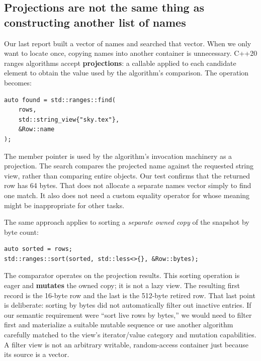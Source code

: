 \subsection{Projections are not the same thing as constructing another list of names}\label{01-foundations-i-ch006-projections-are-not-the-same-thing-as-constructing-another-list-of-names}

\hypertarget{01-foundations-i-ch006-projections-are-not-the-same-thing-as-constructing-another-list-of-names}{}

Our last report built a vector of names and searched that vector. When we only want to locate  once, copying names into another container is unnecessary. C++20 ranges algorithms accept \textbf{projections}: a callable applied to each candidate element to obtain the value used by the algorithm's comparison. The operation becomes:

\begin{verbatim}
auto found = std::ranges::find(
    rows,
    std::string_view{"sky.tex"},
    &Row::name
);
\end{verbatim}

The member pointer  is used by the algorithm's invocation machinery as a projection. The search compares the projected name against the requested string view, rather than comparing entire  objects. Our test confirms that the returned row has 64 bytes. That does not allocate a separate names vector simply to find one match. It also does not need a custom equality operator for  whose meaning might be inappropriate for other tasks.

The same approach applies to sorting a \emph{separate owned copy} of the snapshot by byte count:

\begin{verbatim}
auto sorted = rows;
std::ranges::sort(sorted, std::less<>{}, &Row::bytes);
\end{verbatim}

The comparator operates on the projection results. This sorting operation is eager and \textbf{mutates} the owned copy; it is not a lazy view. The resulting first record is the 16-byte row and the last is the 512-byte retired row. That last point is deliberate: sorting by bytes did not automatically filter out inactive entries. If our semantic requirement were ``sort live rows by bytes,'' we would need to filter first and materialize a suitable mutable sequence or use another algorithm carefully matched to the view's iterator/value category and mutation capabilities. A filter view is not an arbitrary writable, random-access container just because its source is a vector.

